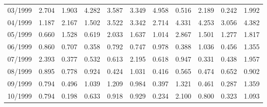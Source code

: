 \begin{tabular}{lrrrrrrrrrr}
03/1999 &  2.704 &  1.903 &  4.282 &  3.587 &  3.349 &  4.958 &  0.516 &  2.189 &  0.242 &  1.992 \\
04/1999 &  1.187 &  2.167 &  1.502 &  3.522 &  3.342 &  2.714 &  4.331 &  4.253 &  3.056 &  4.382 \\
05/1999 &  0.660 &  1.528 &  0.619 &  2.033 &  1.637 &  1.014 &  2.867 &  1.501 &  1.277 &  1.817 \\
06/1999 &  0.860 &  0.707 &  0.358 &  0.792 &  0.747 &  0.978 &  0.388 &  1.036 &  0.456 &  1.355 \\
07/1999 &  2.393 &  0.377 &  0.532 &  0.613 &  2.195 &  0.618 &  0.947 &  0.331 &  0.438 &  1.957 \\
08/1999 &  0.895 &  0.778 &  0.924 &  0.424 &  1.031 &  0.416 &  0.565 &  0.474 &  0.652 &  0.902 \\
09/1999 &  0.794 &  0.496 &  1.039 &  1.209 &  0.984 &  0.397 &  1.321 &  0.461 &  0.287 &  1.359 \\
10/1999 &  0.794 &  0.198 &  0.633 &  0.918 &  0.929 &  0.234 &  2.100 &  0.800 &  0.323 &  1.093 \\
\bottomrule
\end{tabular}
